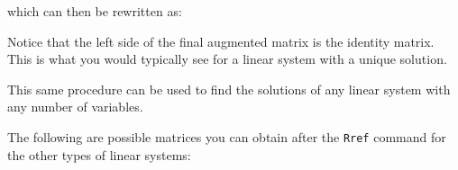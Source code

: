 \documentclass[a5paper]{memoir}
\def\code#1{\texttt{#1}}
\begin{document}
which can then be rewritten as:
\begin{center}
\end{center}

Notice that the left side of the final augmented matrix is the identity matrix. This is what you would typically see for a linear system with a unique solution.

This same procedure can be used to find the solutions of any linear system with any number of variables.

The following are possible matrices you can obtain after the \code{Rref} command for the other types of linear systems:
\end{document}
